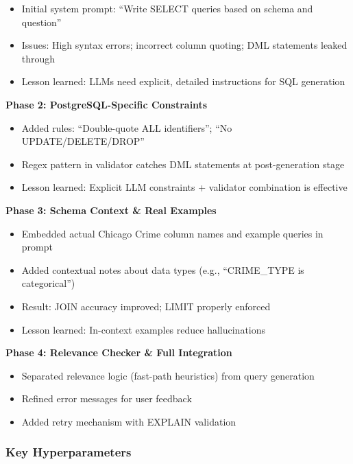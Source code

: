 \documentclass{article}
\begin{document}
\begin{itemize}
  \item Initial system prompt: ``Write SELECT queries based on schema and question''
  \item Issues: High syntax errors; incorrect column quoting; DML statements leaked through
  \item Lesson learned: LLMs need explicit, detailed instructions for SQL generation
\end{itemize}

\noindent\textbf{Phase 2: PostgreSQL-Specific Constraints}

\begin{itemize}
  \item Added rules: ``Double-quote ALL identifiers''; ``No UPDATE/DELETE/DROP''
  \item Regex pattern in validator catches DML statements at post-generation stage
  \item Lesson learned: Explicit LLM constraints + validator combination is effective
\end{itemize}

\noindent\textbf{Phase 3: Schema Context \& Real Examples}

\begin{itemize}
  \item Embedded actual Chicago Crime column names and example queries in prompt
  \item Added contextual notes about data types (e.g., ``CRIME\_TYPE is categorical'')
  \item Result: JOIN accuracy improved; LIMIT properly enforced
  \item Lesson learned: In-context examples reduce hallucinations
\end{itemize}

\noindent\textbf{Phase 4: Relevance Checker \& Full Integration}

\begin{itemize}
  \item Separated relevance logic (fast-path heuristics) from query generation
  \item Refined error messages for user feedback
  \item Added retry mechanism with EXPLAIN validation
\end{itemize}

\subsubsection{Key Hyperparameters}
\end{document}
